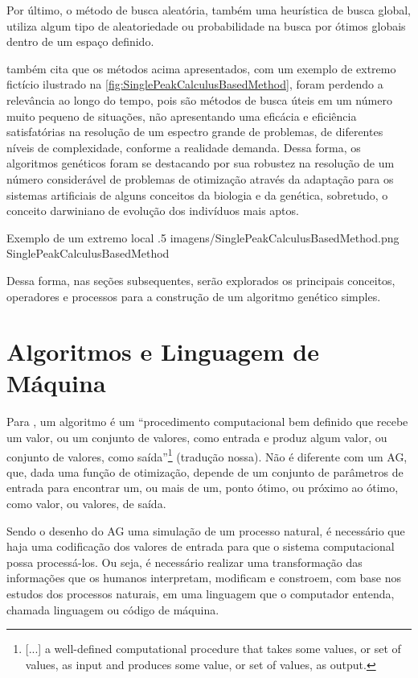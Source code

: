 Por último, o método de busca aleatória, também uma heurística de busca global, utiliza algum tipo de aleatoriedade ou probabilidade na busca por ótimos globais dentro de um espaço definido.

\citet[pg.5]{goldberg_genetic_1989} também cita que os métodos acima apresentados, com um exemplo de extremo fictício ilustrado na \autoref{fig:SinglePeakCalculusBasedMethod}, foram perdendo a relevância ao longo do tempo, pois são métodos de busca úteis em um número muito pequeno de situações, não apresentando uma eficácia e eficiência satisfatórias na resolução de um espectro grande de problemas, de diferentes níveis de complexidade, conforme a realidade demanda. Dessa forma, os algoritmos genéticos foram se destacando por sua robustez na resolução de um número considerável de problemas de otimização através da adaptação para os sistemas artificiais de alguns conceitos da biologia e da genética, sobretudo, o conceito darwiniano de evolução dos indivíduos mais aptos.

\figura
	{Exemplo de um extremo local}
	{.5}
	{imagens/SinglePeakCalculusBasedMethod.png}
	{SinglePeakCalculusBasedMethod}
	{
		\citet[p.3]{goldberg_genetic_1989}
	}

Dessa forma, nas seções subsequentes, serão explorados os principais conceitos, operadores e processos para a construção de um algoritmo genético simples.

\section{Algoritmos e Linguagem de Máquina}
\label{sec:algoritmos_e_linguagem_de_maquina}

Para \citet[pg.2]{cormen_introduction_2009}, um algoritmo é um \enquote{procedimento computacional bem definido que recebe um valor, ou um conjunto de valores, como entrada e produz algum valor, ou conjunto de valores, como saída}\footnote{[...] a well-defined computational procedure that takes some values, or set of values, as input and produces some value, or set of values, as output.} (tradução nossa). Não é diferente com um AG, que, dada uma função de otimização, depende de um conjunto de parâmetros de entrada para encontrar um, ou mais de um, ponto ótimo, ou próximo ao ótimo, como valor, ou valores, de saída.

Sendo o desenho do AG uma simulação de um processo natural, é necessário que haja uma codificação dos valores de entrada para que o sistema computacional possa processá-los. Ou seja, é necessário realizar uma transformação das informações que os humanos interpretam, modificam e constroem, com base nos estudos dos processos naturais, em uma linguagem que o computador entenda, chamada linguagem ou código de máquina. 

